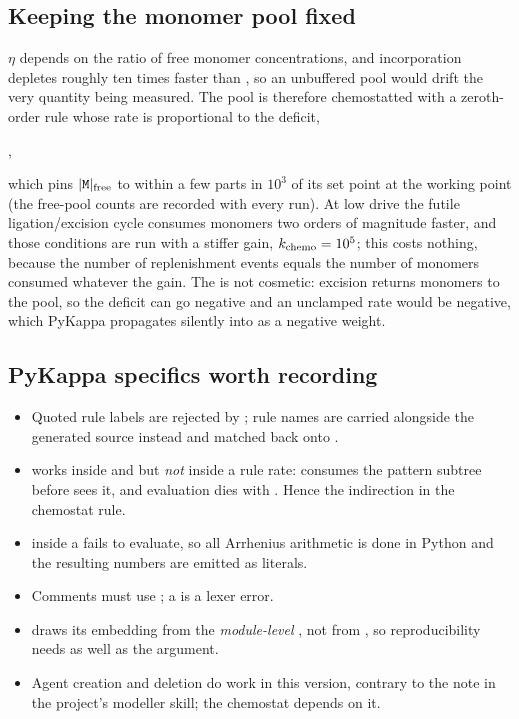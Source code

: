 

\subsection{Keeping the monomer pool fixed}

$\eta$ depends on the ratio of free monomer concentrations, and incorporation depletes
 roughly ten times faster than , so an unbuffered pool would drift the very
quantity being measured.  The pool is therefore chemostatted with a zeroth-order rule
whose rate is proportional to the deficit,
\begin{center}
,
\end{center}
which pins $|\texttt{M}|_{\rm free}$ to within a few parts in $10^3$ of its set point at the
working point (the free-pool counts are recorded with every run).  At low drive the
futile ligation/excision cycle consumes monomers two orders of magnitude faster, and
those conditions are run with a stiffer gain, $k_{\rm chemo}=10^5$; this costs nothing,
because the number of replenishment events equals the number of monomers consumed
whatever the gain.  The  is not cosmetic:
excision returns monomers to the pool, so the deficit can go negative and an unclamped
rate would be negative, which PyKappa propagates silently into
 as a negative weight.

\subsection{PyKappa specifics worth recording}

\begin{itemize}\itemsep1pt
\item Quoted rule labels are rejected by ; rule names are carried
  alongside the generated source instead and matched back onto .
\item {} works inside  and  but \emph{not} inside a rule
  rate:  consumes the pattern subtree before
   sees it, and evaluation dies with
  .  Hence the  indirection in the
  chemostat rule.
\item \ka{[exp]} inside a  fails to evaluate, so all Arrhenius arithmetic is
  done in Python and the resulting numbers are emitted as literals.
\item Comments must use \ka{//}; a \ka{\#} is a lexer error.
\item {} draws its embedding from the \emph{module-level}
  , not from , so reproducibility needs 
  as well as the  argument.
\item Agent creation and deletion do work in this version, contrary to the note in the
  project's modeller skill; the chemostat depends on it.
\end{itemize}

